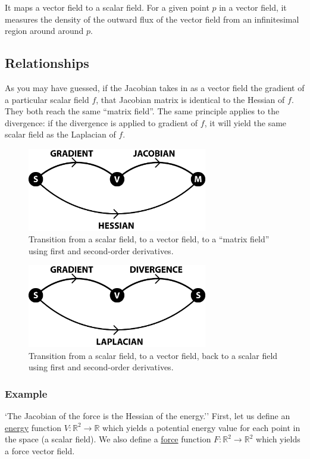 \documentclass{article}
\begin{document}
It maps a vector field to a scalar field. For a given point $p$ in a vector
field, it measures the density of the outward flux of the vector field from an
infinitesimal region around around $p$.
\subsection{Relationships}
As you may have guessed, if the Jacobian takes in as a vector field the gradient
of a particular scalar field $f$, that Jacobian matrix is identical to the
Hessian of $f$. They both reach the same ``matrix field''. The same principle
applies to the divergence: if the divergence is applied to gradient of $f$, it
will yield the same scalar field as the Laplacian of $f$.
\begin{figure}[H]
  \centering
  \includegraphics[width=0.7\textwidth]{img/hessian.png}
  \caption{Transition from a scalar field, to a vector field, to a ``matrix
  field'' using first and second-order derivatives.}    
\end{figure}

\begin{figure}[H]
  \centering
  \includegraphics[width=0.7\textwidth]{img/laplacian.png}
  \caption{Transition from a scalar field, to a vector field, back to a scalar
  field using first and second-order derivatives.}    
\end{figure}

\subsubsection{Example}
`The Jacobian of the force is the Hessian of the energy.'' First, let us define
an \underline{energy} function $V : \mathbb{R}^2 \rightarrow \mathbb{R}$ which
yields a potential energy value for each point in the space (a scalar field). We
also define a \underline{force} function $F : \mathbb{R}^2 \rightarrow
\mathbb{R}^2$ which yields a force vector field.
\end{document}
